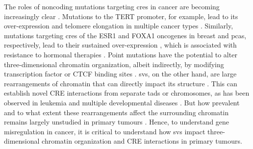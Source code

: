 The roles of noncoding mutations targeting \glspl{cre} in cancer are becoming increasingly clear \cite{zhouEmergenceNoncodingCancer2016,rheinbayAnalysesNoncodingSomatic2020,liPatternsSomaticStructural2020}.
Mutations to the TERT promoter, for example, lead to its over-expression and telomere elongation in multiple cancer types \cite{vinagreFrequencyTERTPromoter2013,huangHighlyRecurrentTERT2013,sternMutationTERTPromoter2015}.
Similarly, mutations targeting \glspl{cre} of the ESR1 and FOXA1 oncogenes in breast and \glspl{pca}, respectively, lead to their sustained over-expression \cite{baileyNoncodingSomaticInherited2016,zhouNoncodingMutationsTarget2020,paroliaDistinctStructuralClasses2019}, which is associated with resistance to hormonal therapies \cite{jeselsohnESR1MutationsMechanism2015,robinsonFoxA1KeyMediator2012,fuFOXA1OverexpressionMediates2016,fuFOXA1UpregulationPromotes2019}.
Point mutations have the potential to alter three-dimensional chromatin organization, albeit indirectly, by modifying transcription factor or CTCF binding sites \cite{mauranoLargescaleIdentificationSequence2015,guoMutationHotspotsCTCF2018}.
\glspl{sv}, on the other hand, are large rearrangements of chromatin that can directly impact its structure \cite{dixonIntegrativeDetectionAnalysis2018,akdemirDisruptionChromatinFolding2020}.
This can establish novel CRE interactions from separate \glspl{tad} or chromosomes, as has been observed in leukemia \cite{hniszActivationProtooncogenesDisruption2016} and multiple developmental diseases \cite{lupianezDisruptionsTopologicalChromatin2015,allouNoncodingDeletionsIdentify2021}.
But how prevalent and to what extent these rearrangements affect the surrounding chromatin remains largely unstudied in primary tumours \cite{akdemirDisruptionChromatinFolding2020,liPatternsSomaticStructural2020,iyyankiSubtypeassociatedEpigenomicLandscape2021}.
Hence, to understand gene misregulation in cancer, it is critical to understand how \glspl{sv} impact three-dimensional chromatin organization and CRE interactions in primary tumours.

